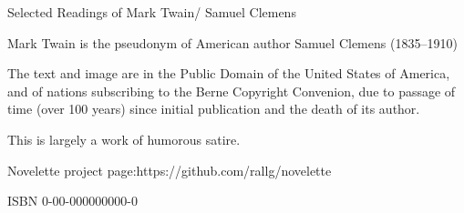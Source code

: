 \documentclass[../interior-demo.tex]{subfiles}
\begin{document}
\begin{fullpage} %
\null\null\null\null\null %
\null\null\null %
\vfill %
\end{fullpage}

\begin{copyrightpage}
\vfill %
Selected Readings of Mark Twain\br/ Samuel Clemens\par
Mark Twain is the pseudonym of American\br
author Samuel Clemens (1835--1910)\par
The text and image are in the Public Domain\br
of the United States of America, and of nations\br
subscribing to the Berne Copyright Convenion,\br
due to passage of time (over 100 years) since\br
initial publication and the death of its author.\par
This is largely a work of humorous satire.\par
Novelette project page:\br https://github.com/rallg/novelette\par
ISBN 0-00-000000000-0\par
\end{copyrightpage}
\end{document}
